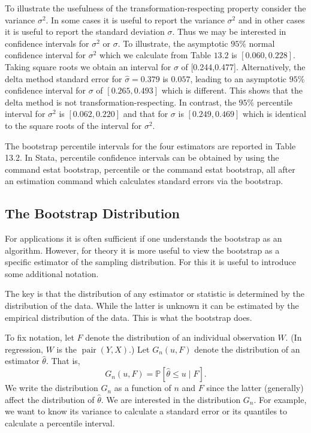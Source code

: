 \documentclass[10pt]{article}
\begin{document}
To illustrate the usefulness of the transformation-respecting property consider the variance $\sigma^{2}$. In some cases it is useful to report the variance $\sigma^{2}$ and in other cases it is useful to report the standard deviation $\sigma$. Thus we may be interested in confidence intervals for $\sigma^{2}$ or $\sigma$. To illustrate, the asymptotic $95 \%$ normal confidence interval for $\sigma^{2}$ which we calculate from Table $13.2$ is $[0.060,0.228]$. Taking square roots we obtain an interval for $\sigma$ of [0.244,0.477]. Alternatively, the delta method standard error for $\widehat{\sigma}=0.379$ is $0.057$, leading to an asymptotic $95 \%$ confidence interval for $\sigma$ of $[0.265,0.493]$ which is different. This shows that the delta method is not transformation-respecting. In contrast, the $95 \%$ percentile interval for $\sigma^{2}$ is $[0.062,0.220]$ and that for $\sigma$ is $[0.249,0.469]$ which is identical to the square roots of the interval for $\sigma^{2}$.

The bootstrap percentile intervals for the four estimators are reported in Table 13.2. In Stata, percentile confidence intervals can be obtained by using the command estat bootstrap, percentile or the command estat bootstrap, all after an estimation command which calculates standard errors via the bootstrap.

\subsection{The Bootstrap Distribution}
For applications it is often sufficient if one understands the bootstrap as an algorithm. However, for theory it is more useful to view the bootstrap as a specific estimator of the sampling distribution. For this it is useful to introduce some additional notation.

The key is that the distribution of any estimator or statistic is determined by the distribution of the data. While the latter is unknown it can be estimated by the empirical distribution of the data. This is what the bootstrap does.

To fix notation, let $F$ denote the distribution of an individual observation $W$. (In regression, $W$ is the $\operatorname{pair}(Y, X)$.) Let $G_{n}(u, F)$ denote the distribution of an estimator $\widehat{\theta}$. That is,
$$
G_{n}(u, F)=\mathbb{P}[\widehat{\theta} \leq u \mid F] .
$$
We write the distribution $G_{n}$ as a function of $n$ and $F$ since the latter (generally) affect the distribution of $\widehat{\theta}$. We are interested in the distribution $G_{n}$. For example, we want to know its variance to calculate a standard error or its quantiles to calculate a percentile interval.
\end{document}
